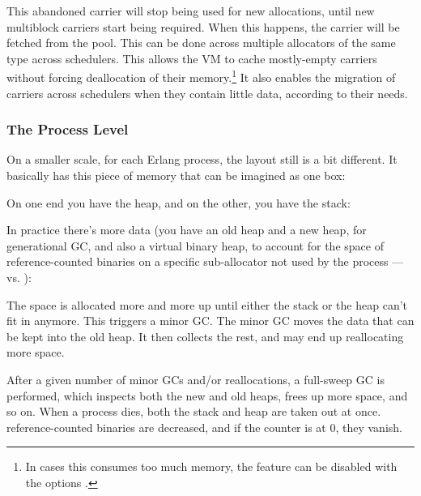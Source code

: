\documentclass[11pt, oneside]{book}   	%
\begin{document}
This abandoned carrier will stop being used for new allocations, until new multiblock carriers start being required. When this happens, the carrier will be fetched from the  pool. This can be done across multiple  allocators of the same type across schedulers. This allows the VM to cache mostly-empty carriers without forcing deallocation of their memory.\footnote{In cases this consumes too much memory, the feature can be disabled with the options .} It also enables the migration of carriers across schedulers when they contain little data, according to their needs.

\subsubsection{The Process Level}
\label{subsec:memory-process-level}

On a smaller scale, for each Erlang process, the layout still is a bit different. It basically has this piece of memory that can be imagined as one box:

\begin{VerbatimText}
[                  ]
\end{VerbatimText}

On one end you have the heap, and on the other, you have the stack:

\begin{VerbatimText}
\end{VerbatimText}

In practice there's more data (you have an old heap and a new heap, for generational GC, and also a virtual binary heap, to account for the space of reference-counted binaries on a specific sub-allocator not used by the process —  vs. ):

\begin{VerbatimText}
\end{VerbatimText}

The space is allocated more and more up until either the stack or the heap can't fit in anymore. This triggers a minor GC. The minor GC moves the data that can be kept into the old heap. It then collects the rest, and may end up reallocating more space.

After a given number of minor GCs and/or reallocations, a full-sweep GC is performed, which inspects both the new and old heaps, frees up more space, and so on. When a process dies, both the stack and heap are taken out at once. reference-counted binaries are decreased, and if the counter is at 0, they vanish.
\end{document}
